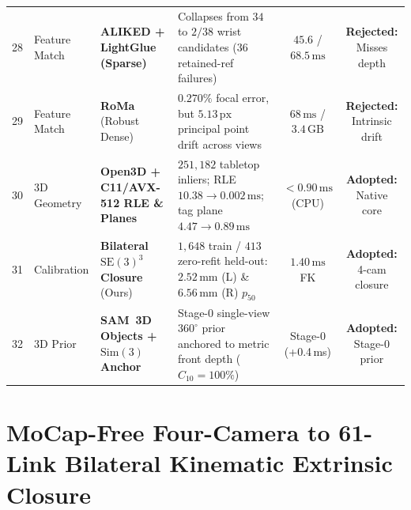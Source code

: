 \documentclass{evidencescene}
\begin{document}
\begin{table}[t]
{\begin{tabular}{@{}rllp{6.5cm}cc@{}}
        28 & Feature Match & \textbf{ALIKED + LightGlue (Sparse)}~\cite{aliked,lightglue} & Collapses from $34$ to $2/38$ wrist candidates ($36$ retained-ref failures) & $45.6$ / $68.5\,\mathrm{ms}$ & \textbf{Rejected:} Misses depth \\
        29 & Feature Match & \textbf{RoMa} (Robust Dense)~\cite{edstedt2024roma} & $0.270\%$ focal error, but $5.13\,\mathrm{px}$ principal point drift across views & $68\,\mathrm{ms}$ / $3.4\,\mathrm{GB}$ & \textbf{Rejected:} Intrinsic drift \\
        \rowcolor{esrow}
        30 & 3D Geometry & \textbf{Open3D + C11/AVX-512 RLE \& Planes}~\cite{zhou2018open3d} & $251{,}182$ tabletop inliers; RLE $10.38\to 0.002\,\mathrm{ms}$; tag plane $4.47\to 0.89\,\mathrm{ms}$ & $<0.90\,\mathrm{ms}$ (CPU) & \textbf{Adopted:} Native core \\
        \rowcolor{esrow}
        31 & Calibration & \textbf{Bilateral $\mathrm{SE}(3)^3$ Closure} (Ours)~\cite{park1994robot} & $1{,}648$ train / $413$ zero-refit held-out: $2.52\,\mathrm{mm}$ (L) \& $6.56\,\mathrm{mm}$ (R) $p_{50}$ & $1.40\,\mathrm{ms}$ FK & \textbf{Adopted:} 4-cam closure \\
        \rowcolor{esrow}
        32 & 3D Prior & \textbf{SAM~3D Objects + $\mathrm{Sim}(3)$ Anchor}~\cite{sam3d2025} & Stage-0 single-view $360^\circ$ prior anchored to metric front depth ($C_{10}{=}100\%$) & Stage-0 (+0.4\,ms) & \textbf{Adopted:} Stage-0 prior \\
        \bottomrule
    \end{tabular}}
\end{table}

\section{MoCap-Free Four-Camera to 61-Link Bilateral Kinematic Extrinsic Closure}
\label{app:closure}
\end{document}
